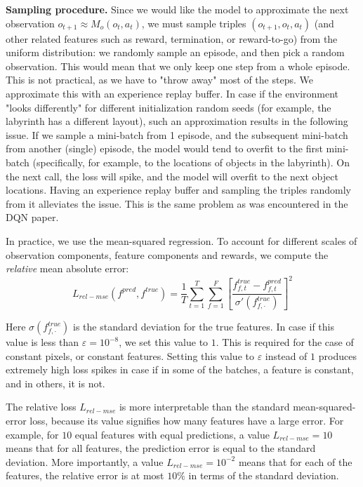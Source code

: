\documentclass[a4paper,11pt,oneside]{report}
\begin{document}
{\bf Sampling procedure.} Since we would like the model to approximate the next observation $o_{t+1}\approx M_o(o_t, a_t)$, we must sample triples $(o_{t+1}, o_t, a_t)$ (and other related features such as reward, termination, or reward-to-go) from the uniform distribution: we randomly sample an episode, and then pick a random observation. This would mean that we only keep one step from a whole episode. This is not practical, as we have to "throw away" most of the steps. We approximate this with an experience replay buffer. In case if the environment "looks differently" for different initialization random seeds (for example, the labyrinth has a different layout), such an approximation results in the following issue. If we sample a mini-batch from 1 episode, and the subsequent mini-batch from another (single) episode, the model would tend to overfit to the first mini-batch (specifically, for example, to the locations of objects in the labyrinth). On the next call, the loss will spike, and the model will overfit to the next object locations. Having an experience replay buffer and sampling the triples randomly from it alleviates the issue. This is the same problem as was encountered in the DQN paper.

In practice, we use the mean-squared regression. To account for different scales of observation components, feature components and rewards, we compute the {\em relative} mean absolute error:
$$
L_{rel-mse}(f^{pred}, f^{true})=\frac{1}{T}\sum\limits_{t=1}^T\sum\limits_{f=1}^F\left[\frac{f^{true}_{f,t}-f^{pred}_{f, t}}{\sigma'(f^{true}_{f, \cdot})}\right]^2
$$

Here $\sigma(f^{true}_{f, \cdot})$ is the standard deviation for the true features. In case if this value is less than $\varepsilon=10^{-8}$, we set this value to $1$. This is required for the case of constant pixels, or constant features. Setting this value to $\varepsilon$ instead of $1$ produces extremely high loss spikes in case if in some of the batches, a feature is constant, and in others, it is not.

The relative loss $L_{rel-mse}$ is more interpretable than the standard mean-squared-error loss, because its value signifies how many features have a large error. For example, for $10$ equal features with equal predictions, a value $L_{rel-mse}=10$ means that for all features, the prediction error is equal to the standard deviation. More importantly, a value $L_{rel-mse}=10^{-2}$ means that for each of the features, the relative error is at most $10\%$ in terms of the standard deviation.
\end{document}
